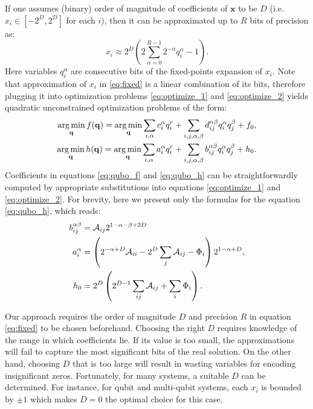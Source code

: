 If one assumes (binary) order of magnitude of coefficients of
$\mathbf x$ to be $D$ (i.e. $x_i \in [-2^D, 2^D]$ for each $i$), then it can be
approximated up to $R$ bits of precision as:
\begin{equation}
  \label{eq:fixed}
  x_i \approx 2^D \left(2 \sum_{\alpha=0}^{R-1}2^{-\alpha}q_i^{\alpha} -1\right).
\end{equation}
Here variables $q_i^\alpha$ are consecutive bits of the fixed-points expansion
of $x_i$. Note that approximation of $x_i$ in \eqref{eq:fixed} is a linear
combination of its bits, therefore plugging it into optimization problems
\eqref{eq:optimize_1} and \eqref{eq:optimize_2} yields quadratic unconstrained
optimization problems of the form:
\begin{align}
  \label{eq:qubo_f}
  \operatorname*{arg\,min}_{\mathbf{q}} f(\mathbf{q}) = \operatorname*{arg\,min}_{\mathbf{q}} \sum_{i,\alpha} c_i^{\alpha} q_i^r + \sum_{i,j,\alpha,\beta} d_{ij}^{\alpha\beta} q_i^{\alpha} q_j^{\beta} + f_0, \\
  \label{eq:qubo_h}
  \operatorname*{arg\,min}_{\mathbf{q}} h(\mathbf{q}) = \operatorname*{arg\,min}_{\mathbf{q}} \sum_{i,\alpha} a_i^{\alpha} q_i^r + \sum_{i,j,\alpha,\beta} b_{ij}^{\alpha\beta} q_i^{\alpha} q_j^{\beta} + h_0.
\end{align}
Coefficients in equations \eqref{eq:qubo_f} and \eqref{eq:qubo_h} can be
straightforwardly computed by appropriate substitutions into equations
\eqref{eq:optimize_1} and \eqref{eq:optimize_2}. For brevity, here we present
only the formulas for the equation \eqref{eq:qubo_h}, which reads:
\begin{eqnarray}
  \begin{split}
    b_{ij}^{\alpha\beta} &= \mathcal{A}_{ij} 2^{1-\alpha-\beta+2D} \\
    a_i^\alpha &= \left( 2^{-\alpha+D}\mathcal{A}_{ii} - 2^D\sum_{j}\mathcal{A}_{ij}- \Phi_i\right)2^{1-\alpha+D},
    \\
    h_0 &= 2^D\left( 2^{D-1}\sum_{ij}\mathcal{A}_{ij}+\sum_i \Phi_i\right).
  \end{split}
  \label{eq:coeff}
\end{eqnarray}

Our approach requires the order of magnitude $D$ and precision $R$ in equation
\eqref{eq:fixed} to be chosen beforehand. Choosing the right $D$ requires
knowledge of the range in which coefficients lie. If its value is too small,
the approximations will fail to capture the most significant bits of the real
solution. On the other hand, choosing $D$ that is too large will result in
wasting variables for encoding insignificant zeros. Fortunately, for many
systems, a suitable $D$ can be determined. For instance, for qubit and
multi-qubit systems, each $x_i$ is bounded by $\pm 1$ which makes $D=0$ the
optimal choice for this case.

